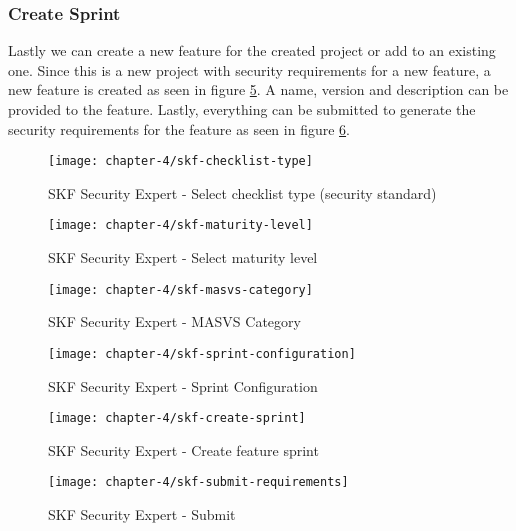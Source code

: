 \subsubsection{Create Sprint}
Lastly we can create a new feature for the created project or add to an existing one. Since this is a new project with security requirements for a new feature, a new feature is created as seen in figure \ref{fig:skf-feature-sprint}. A name, version and description can be provided to the feature. Lastly, everything can be submitted to generate the security requirements for the feature as seen in figure \ref{fig:skf-submit}.

\begin{figure}
    \centering
    \texttt{[image: chapter-4/skf-checklist-type]}
    \caption{SKF Security Expert - Select checklist type (security standard)}
    \label{fig:skf-checklist-type}
\end{figure}

\begin{figure}
    \centering
    \texttt{[image: chapter-4/skf-maturity-level]}
    \caption{SKF Security Expert - Select maturity level}
    \label{fig:skf-maturity-level}
\end{figure}

\begin{figure}
    \centering
    \texttt{[image: chapter-4/skf-masvs-category]}
    \caption{SKF Security Expert - MASVS Category}
    \label{fig:skf-masvs-category}
\end{figure}

\begin{figure}
    \centering
    \texttt{[image: chapter-4/skf-sprint-configuration]}
    \caption{SKF Security Expert - Sprint Configuration}
    \label{fig:skf-sprint-configuration}
\end{figure}

\begin{figure}
    \centering
    \texttt{[image: chapter-4/skf-create-sprint]}
    \caption{SKF Security Expert - Create feature sprint}
    \label{fig:skf-feature-sprint}
\end{figure}

\begin{figure}
    \centering
    \texttt{[image: chapter-4/skf-submit-requirements]}
    \caption{SKF Security Expert - Submit}
    \label{fig:skf-submit}
\end{figure}

